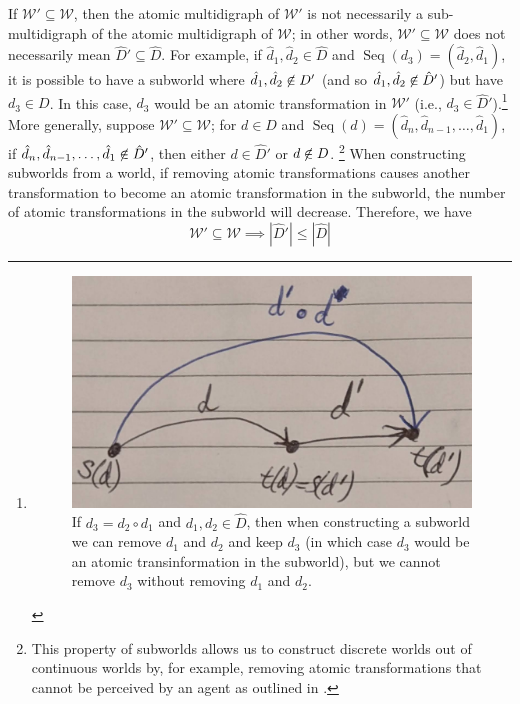 If $\mathscr{W}' \subseteq \mathscr{W}$, then the atomic multidigraph of $\mathscr{W}'$ is not necessarily a sub-multidigraph of the atomic multidigraph of $\mathscr{W}$; in other words, $\mathscr{W}' \subseteq \mathscr{W}$ does not necessarily mean $\hat{D}' \subseteq \hat{D}$. For example, if $\hat{d}_{1}, \hat{d}_{2} \in \hat{D}$ and $\operatorname{Seq}(d_{3}) = (\hat{d}_{2}, \hat{d}_{1})$, it is possible to have a subworld where $\hat{d}_{1}, \hat{d}_{2} \centernot\in D'$ (and so $\hat{d}_{1}, \hat{d}_{2} \centernot\in \hat{D}'$) but have $d_{3} \in D$.
In this case, $d_{3}$ would be an atomic transformation in $\mathscr{W}'$ (i.e., $d_{3} \in \hat{D}'$).\footnote{
\begin{figure}[H]
    \includegraphics[width=0.5\linewidth]{2MathematicalFramework/Images/transformation_composition.jpg}
    \caption{
    If $d_{3} = d_{2} \circ d_{1}$ and $d_{1}, d_{2} \in \hat{D}$, then when constructing a subworld we can remove $d_{1}$ and $d_{2}$ and keep $d_{3}$ (in which case $d_{3}$ would be an atomic transinformation in the subworld), but we cannot remove $d_{3}$ without removing $d_{1}$ and $d_{2}$.
    }
\end{figure}
}
More generally, suppose $\mathscr{W}' \subseteq \mathscr{W}$; for $d \in D$ and $\operatorname{Seq}(d) = (\hat{d}_{n}, \hat{d}_{n-1}, \dots, \hat{d}_{1})$, if $\hat{d}_{n}, \hat{d}_{n-1}, \dots, \hat{d}_{1} \centernot\in \hat{D}'$, then either $d \in \hat{D}'$ or $d \centernot\in D$.
\footnote{
This property of subworlds allows us to construct discrete worlds out of continuous worlds by, for example, removing atomic transformations that cannot be perceived by an agent as outlined in 
.
}
When constructing subworlds from a world, if removing atomic transformations causes another transformation to become an atomic transformation in the subworld, the number of atomic transformations in the subworld will decrease.
Therefore, we have
\begin{equation}
    \mathscr{W}' \subseteq \mathscr{W} \implies |\hat{D}'| \leq |\hat{D}|
\end{equation}


